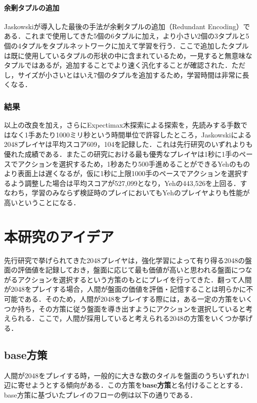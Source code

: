 \documentclass{suribt}
\begin{document}
\subsubsection{余剰タプルの追加}
Jaskowskiが導入した最後の手法が余剰タプルの追加（Redundant Encoding）である．これまで使用してきた5個の6タプルに加え，より小さい2個の3タプルと5個の4タプルをタプルネットワークに加えて学習を行う．ここで追加したタプルは既に使用しているタプルの形状の中に含まれているため，一見すると無意味なタプルではあるが，追加することでより速く汎化することが確認された．ただし，サイズが小さいとはいえ7個のタプルを追加するため，学習時間は非常に長くなる．

\subsection{結果}
以上の改良を加え，さらにExpectimax木探索による探索を，先読みする手数ではなく1手あたり1000ミリ秒という時間単位で許容したところ，Jaskowskiによる2048プレイヤは平均スコア609，104を記録した．これは先行研究のいずれよりも優れた成績である．またこの研究における最も優秀なプレイヤは1秒に1手のペースでアクションを選択するため，1秒あたり500手進めることができるYehのものより表面上は遅くなるが，仮に1秒に上限1000手のペースでアクションを選択するよう調整した場合は平均スコアが527,099となり，Yehの443,526を上回る．すなわち，学習のみならず検証時のプレイにおいてもYehのプレイヤよりも性能が高いということになる．

\chapter{本研究のアイデア}
先行研究で挙げられてきた2048プレイヤは，強化学習によって有り得る2048の盤面の評価値を記録しておき，盤面に応じて最も価値が高いと思われる盤面につながるアクションを選択するという方策のもとにプレイを行ってきた．翻って人間が2048をプレイする場合，人間が盤面の価値を評価・記憶することは明らかに不可能である．そのため，人間が2048をプレイする際には，ある一定の方策をいくつか持ち，その方策に従う盤面を導き出すようにアクションを選択していると考えられる．ここで，人間が採用していると考えられる2048の方策をいくつか挙げる．

\section{base方策}
人間が2048をプレイする時，一般的に大きな数のタイルを盤面のうちいずれか1辺に寄せようとする傾向がある．この方策を\textbf{base方策}と名付けることとする．base方策に基づいたプレイのフローの例は以下の通りである．
\end{document}
